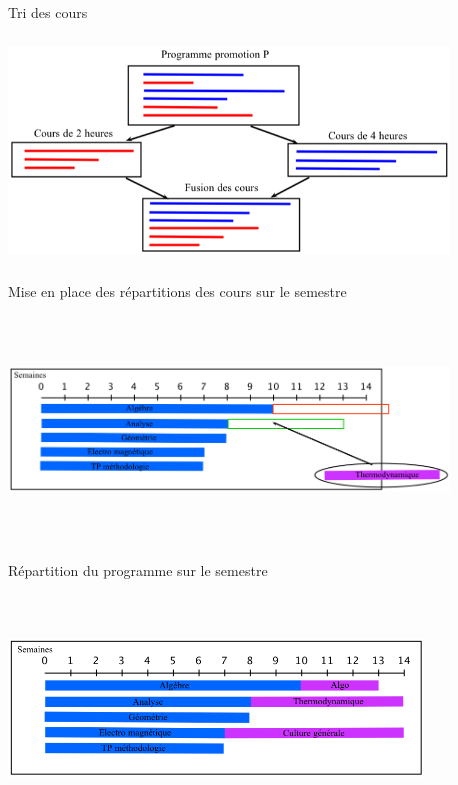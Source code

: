 \documentclass{beamer}
\begin{document}
\begin{frame}
Tri des cours
\begin{center}
\includegraphics [width=117mm, height=60mm]{Dessin1.png}
\end{center}
\end{frame}

\begin{frame}
Mise en place des répartitions des cours sur le semestre
\begin{center}
\includegraphics [width=117mm, height=60mm]{RepartitionSemestre2.png}
\end{center}
\end{frame}

\begin{frame}
Répartition du programme sur le semestre
\begin{center}
\includegraphics [width=110mm, height=60mm]{RepartitionSemestre.png}
\end{center}
\end{frame}
\end{document}
